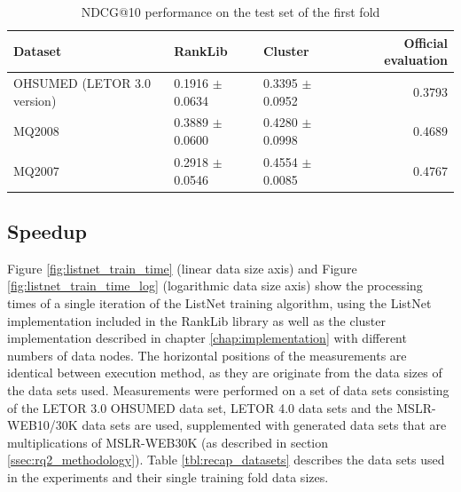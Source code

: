 \begin{table}
\centering
\begin{tabular}{p{3.5cm}p{2.6cm}p{2.6cm}r}\toprule
Dataset & RankLib & Cluster & Official evaluation \\
\midrule
OHSUMED (LETOR 3.0 version) & 0.1916 $\pm$ 0.0634 & 0.3395 $\pm$ 0.0952 & 0.3793 \\
MQ2008      				& 0.3889 $\pm$ 0.0600 & 0.4280 $\pm$ 0.0998 & 0.4689 \\
MQ2007      				& 0.2918 $\pm$ 0.0546 & 0.4554 $\pm$ 0.0085 & 0.4767 \\
\bottomrule
\end{tabular}
\caption{\acs{NDCG}@10 performance on the test set of the first fold}
\label{tbl:accuracy_comparison}
\end{table}

\subsection{Speedup}
\label{ssec:speedup}
Figure \ref{fig:listnet_train_time} (linear data size axis) and Figure \ref{fig:listnet_train_time_log} (logarithmic data size axis) show the processing times of a single iteration of the ListNet training algorithm, using the ListNet implementation included in the RankLib library as well as the cluster implementation described in chapter \ref{chap:implementation} with different numbers of data nodes. The horizontal positions of the measurements are identical between execution method, as they are originate from the data sizes of the data sets used. Measurements were performed on a set of data sets consisting of the LETOR 3.0 OHSUMED data set, LETOR 4.0 data sets and the MSLR-WEB10/30K data sets are used, supplemented with generated data sets that are multiplications of MSLR-WEB30K (as described in section \ref{ssec:rq2_methodology}). Table \ref{tbl:recap_datasets} describes the data sets used in the experiments and their single training fold data sizes.\\

